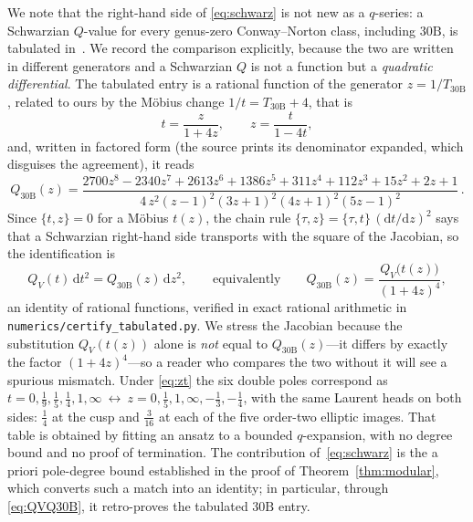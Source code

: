 \documentclass[11pt]{article}
\newcommand{\rmd}{\mathrm{d}}
\theoremstyle{plain}
\theoremstyle{remark}
\begin{document}
We note that the right-hand side of \eqref{eq:schwarz} is not new as a $q$-series: a Schwarzian
$Q$-value for every genus-zero Conway--Norton class, including $30\mathrm{B}$, is tabulated
in~\cite{LianWiczer2006}. We record the comparison explicitly, because the two are written in
different generators and a Schwarzian $Q$ is not a function but a \emph{quadratic differential}.
The tabulated entry is a rational function of the generator $z=1/T_{30\mathrm{B}}$, related to ours
by the M\"obius change $1/t=T_{30\mathrm{B}}+4$, that is
\begin{equation}
t=\frac{z}{1+4z},\qquad z=\frac{t}{1-4t},
\label{eq:zt}
\end{equation}
and, written in factored form (the source prints its denominator expanded, which disguises the
agreement), it reads
\begin{equation}
Q_{30\mathrm{B}}(z)=\frac{2700z^8-2340z^7+2613z^6+1386z^5+311z^4+112z^3+15z^2+2z+1}
{4\,z^2(z-1)^2(3z+1)^2(4z+1)^2(5z-1)^2}\,.
\label{eq:Q30B}
\end{equation}
Since $\{t,z\}=0$ for a M\"obius $t(z)$, the chain rule $\{\tau,z\}=\{\tau,t\}\,(\rmd t/\rmd z)^2$
says that a Schwarzian right-hand side transports with the square of the Jacobian, so the
identification is
\begin{equation}
Q_V(t)\,\rmd t^2=Q_{30\mathrm{B}}(z)\,\rmd z^2,
\qquad\text{equivalently}\qquad
Q_{30\mathrm{B}}(z)=\frac{Q_V\big(t(z)\big)}{(1+4z)^4},
\label{eq:QVQ30B}
\end{equation}
an identity of rational functions, verified in exact rational arithmetic in
\texttt{numerics/\allowbreak certify\_\allowbreak tabulated.py}. We stress the Jacobian because the
substitution $Q_V(t(z))$ alone is \emph{not} equal to $Q_{30\mathrm{B}}(z)$---it differs by exactly
the factor $(1+4z)^4$---so a reader who compares the two without it will see a spurious mismatch.
Under \eqref{eq:zt} the six double poles correspond as
$t=0,\tfrac19,\tfrac15,\tfrac14,1,\infty\ \leftrightarrow\ z=0,\tfrac15,1,\infty,-\tfrac13,-\tfrac14$,
with the same Laurent heads on both sides: $\tfrac14$ at the cusp and $\tfrac3{16}$ at each of the
five order-two elliptic images. That table is obtained by fitting an ansatz to a bounded
$q$-expansion, with no degree bound and no proof of termination. The contribution
of~\eqref{eq:schwarz} is the a priori pole-degree bound established in the proof of
Theorem~\ref{thm:modular}, which converts such a match into an identity; in particular, through
\eqref{eq:QVQ30B}, it retro-proves the tabulated $30\mathrm{B}$ entry.
\end{document}
